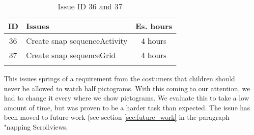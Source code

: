 \begin{longtable} { | c | p{12cm} | c | } 
\hline
	ID 	&	Issues	&		 Es. hours \\\hline
	36 	&	Create snap sequenceActivity	&	4 hours \\\hline
	37 	&	Create snap sequenceGrid		&	4 hours \\\hline
\caption{Issue ID 36 and 37}
\label{tab:spr3_Snapping}
\end{longtable}
This issues springs of a requirement from the costumers that children should never be allowed to watch half pictograms. With this coming to our attention, we had to change it every where we show pictograms. We evaluate this to take a low amount of time, but was proven to be a harder task than expected. The issue has been moved to future work (see section \ref{sec:future_work} in the paragraph "napping Scrollviews.
